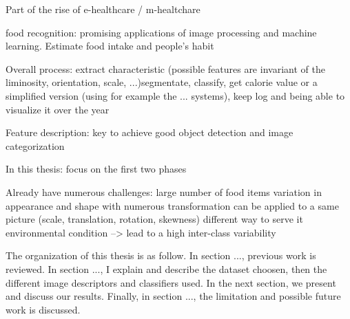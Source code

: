 Part of the rise of e-healthcare / m-healtchare \cite{Hillestad2005, Menachemi2011}

food recognition: promising applications of image processing and machine learning. Estimate food intake and people's habit

Overall process:
extract characteristic (possible features are invariant of the liminosity, orientation, scale, ...)segmentate, classify, get calorie value or a simplified version (using for example the ... systems), keep log and being able to visualize it over the year

Feature description: key to achieve good object detection and image categorization

In this thesis: focus on the first two phases

Already have numerous challenges:
large number of food items
variation in appearance and shape with numerous transformation can be applied to a same picture (scale, translation, rotation, skewness)
different way to serve it
environmental condition
--> lead to a high inter-class variability


The organization of this thesis is as follow. In section ..., previous work is reviewed. In section ..., I explain and describe the dataset choosen, then the different image descriptors and classifiers used. In the next section, we present and discuss our results. Finally, in section ..., the limitation and possible future work is discussed.


